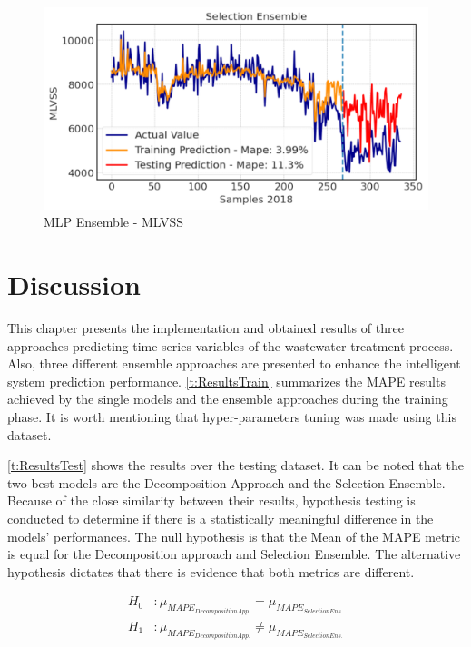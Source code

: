 \begin{figure}[h!]
\centering
\includegraphics[width=\linewidth]{figures/Ch5/MVLSS-E_ann2.pdf}
\caption{MLP Ensemble - MLVSS}
\label{f:ann2-MLVSS}
\end{figure}

\section{Discussion}
\label{s:Contribution-2-Summary}

This chapter presents the implementation and obtained results of three approaches predicting time series variables of the wastewater treatment process. Also, three different ensemble approaches are presented to enhance the intelligent system prediction performance.
\autoref{t:ResultsTrain} summarizes the \ac{MAPE} results achieved by the single models and the ensemble approaches during the training phase. It is worth mentioning that hyper-parameters tuning was made using this dataset. 
 

\autoref{t:ResultsTest} shows the results over the testing dataset. It can be noted that the two best models are the Decomposition Approach and the Selection Ensemble. Because of the close similarity between their results, hypothesis testing is conducted to determine if there is a statistically meaningful difference in the models' performances. The null hypothesis is that the Mean of the \ac{MAPE} metric is equal for the Decomposition approach and Selection Ensemble. The alternative hypothesis dictates that there is evidence that both metrics are different.


\newpage
\begin{align*}
H_{0}  & :\mu_{MAPE_{Decomposition App.}}=\mu_{MAPE_{Selection Ens.}}\\
H_{1}  & :\mu_{MAPE_{Decomposition App.}}\neq\mu_{MAPE_{Selection Ens.}}\\
\end{align*}

